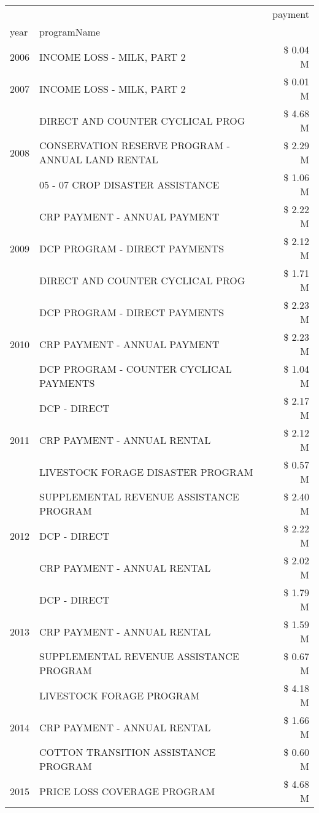 \begin{tabular}{llr}
\toprule
 &  & payment \\
year & programName &  \\
\midrule
2006 & INCOME LOSS - MILK, PART 2 & \$ 0.04 M \\
\cline{1-3}
2007 & INCOME LOSS - MILK, PART 2 & \$ 0.01 M \\
\cline{1-3}
\multirow[t]{3}{*}{2008} & DIRECT AND COUNTER CYCLICAL PROG & \$ 4.68 M \\
 & CONSERVATION RESERVE PROGRAM - ANNUAL LAND RENTAL & \$ 2.29 M \\
 & 05 - 07 CROP DISASTER ASSISTANCE & \$ 1.06 M \\
\cline{1-3}
\multirow[t]{3}{*}{2009} & CRP PAYMENT - ANNUAL PAYMENT & \$ 2.22 M \\
 & DCP PROGRAM - DIRECT PAYMENTS & \$ 2.12 M \\
 & DIRECT AND COUNTER CYCLICAL PROG & \$ 1.71 M \\
\cline{1-3}
\multirow[t]{3}{*}{2010} & DCP PROGRAM - DIRECT PAYMENTS & \$ 2.23 M \\
 & CRP PAYMENT - ANNUAL PAYMENT & \$ 2.23 M \\
 & DCP PROGRAM - COUNTER CYCLICAL PAYMENTS & \$ 1.04 M \\
\cline{1-3}
\multirow[t]{3}{*}{2011} & DCP - DIRECT & \$ 2.17 M \\
 & CRP PAYMENT - ANNUAL RENTAL & \$ 2.12 M \\
 & LIVESTOCK FORAGE DISASTER PROGRAM & \$ 0.57 M \\
\cline{1-3}
\multirow[t]{3}{*}{2012} & SUPPLEMENTAL REVENUE ASSISTANCE PROGRAM & \$ 2.40 M \\
 & DCP - DIRECT & \$ 2.22 M \\
 & CRP PAYMENT - ANNUAL RENTAL & \$ 2.02 M \\
\cline{1-3}
\multirow[t]{3}{*}{2013} & DCP - DIRECT & \$ 1.79 M \\
 & CRP PAYMENT - ANNUAL RENTAL & \$ 1.59 M \\
 & SUPPLEMENTAL REVENUE ASSISTANCE PROGRAM & \$ 0.67 M \\
\cline{1-3}
\multirow[t]{3}{*}{2014} & LIVESTOCK FORAGE PROGRAM & \$ 4.18 M \\
 & CRP PAYMENT - ANNUAL RENTAL & \$ 1.66 M \\
 & COTTON TRANSITION ASSISTANCE PROGRAM & \$ 0.60 M \\
\cline{1-3}
\multirow[t]{3}{*}{2015} & PRICE LOSS COVERAGE PROGRAM & \$ 4.68 M \\

\end{tabular}
